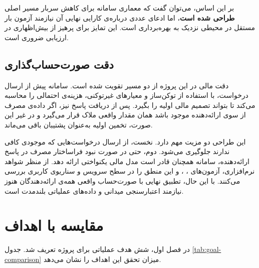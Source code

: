 بر این اساس، می‌توان گفت که معماری سامانه برای کاهش سربار مسیر اصلی
\textbf{طراحی شده است}، اما ادعای عددی درباره‌ی کارایی نهایی آن نیازمند
آزمون بار مستقل در محیطی نزدیک به بهره‌برداری است. این تمایز برای پرهیز
از بیش‌اظهاری در ارزیابی ضروری است.

\subsection{دقت صورت‌حساب‌گذاری}

دقت مالی در این پروژه از دو مسیر تقویت شده است. سامانه پیش از ارسال
درخواست، با استفاده از توکن‌ساز  و معیارهای غیرتوکنی، هزینه‌ی
احتمالی را محاسبه می‌کند تا بتواند تصمیم مالی اولیه را بگیرد. پس از
دریافت پاسخ نیز، اگر داده‌ی مصرف از سوی ارائه‌دهنده موجود باشد همان مقدار
واقعی ملاک قرار می‌گیرد و در غیر این صورت، تخمین اولیه به‌عنوان پشتیبان
باقی می‌ماند.

این طراحی دو مزیت مهم دارد. نخست، از ارسال درخواست‌هایی که موجودی کافی
ندارند جلوگیری می‌شود. دوم، حتی در صورت نبود فراساختار مصرف در پاسخ
ارائه‌دهنده، سامانه همچنان قادر است مدل مالی یکنواختی ارائه دهد. از منظر
شواهد نرم‌افزاری، آزمون‌های ،
،  و
 این منطق را در سطح سرویس و سناریوی کاربری بررسی
می‌کنند. با این حال، تطبیق نهایی با صورت‌حساب واقعی همه‌ی ارائه‌دهندگان
هنوز نیازمند اعتبارسنجی میدانی و داده‌های عملیاتی بلندمدت است.

\section{مقایسه با اهداف}

در فصل اول، شش هدف عملیاتی برای پروژه تعریف شد. جدول
\ref{tab:goal-comparison} میزان تحقق این اهداف را نشان می‌دهد.


